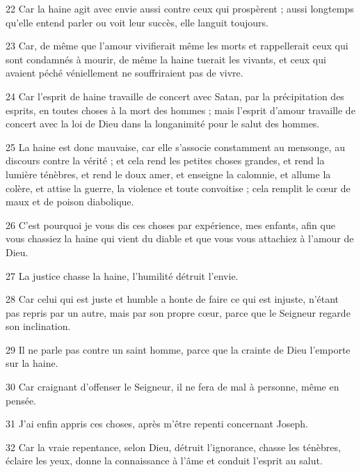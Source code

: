 \par 22 Car la haine agit avec envie aussi contre ceux qui prospèrent ; aussi longtemps qu'elle entend parler ou voit leur succès, elle languit toujours.

\par 23 Car, de même que l'amour vivifierait même les morts et rappellerait ceux qui sont condamnés à mourir, de même la haine tuerait les vivants, et ceux qui avaient péché véniellement ne souffriraient pas de vivre.

\par 24 Car l'esprit de haine travaille de concert avec Satan, par la précipitation des esprits, en toutes choses à la mort des hommes ; mais l'esprit d'amour travaille de concert avec la loi de Dieu dans la longanimité pour le salut des hommes.

\par 25 La haine est donc mauvaise, car elle s'associe constamment au mensonge, au discours contre la vérité ; et cela rend les petites choses grandes, et rend la lumière ténèbres, et rend le doux amer, et enseigne la calomnie, et allume la colère, et attise la guerre, la violence et toute convoitise ; cela remplit le cœur de maux et de poison diabolique.

\par 26 C'est pourquoi je vous dis ces choses par expérience, mes enfants, afin que vous chassiez la haine qui vient du diable et que vous vous attachiez à l'amour de Dieu.

\par 27 La justice chasse la haine, l'humilité détruit l'envie.

\par 28 Car celui qui est juste et humble a honte de faire ce qui est injuste, n'étant pas repris par un autre, mais par son propre cœur, parce que le Seigneur regarde son inclination.

\par 29 Il ne parle pas contre un saint homme, parce que la crainte de Dieu l'emporte sur la haine.

\par 30 Car craignant d'offenser le Seigneur, il ne fera de mal à personne, même en pensée.

\par 31 J'ai enfin appris ces choses, après m'être repenti concernant Joseph.

\par 32 Car la vraie repentance, selon Dieu, détruit l'ignorance, chasse les ténèbres, éclaire les yeux, donne la connaissance à l'âme et conduit l'esprit au salut.

